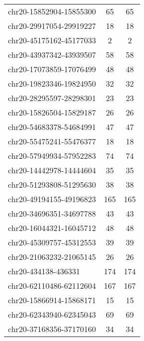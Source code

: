 \begin{longtable}{lSS}
	chr20-15852904-15855300 & 65     & 65                                  \\
	chr20-29917054-29919227 & 18     & 18                                  \\
	chr20-45175162-45177033 & 2      & 2                                   \\
	chr20-43937342-43939507 & 58     & 58                                  \\
	chr20-17073859-17076499 & 48     & 48                                  \\
	chr20-19823346-19824950 & 32     & 32                                  \\
	chr20-28295597-28298301 & 23     & 23                                  \\
	chr20-15826504-15829187 & 26     & 26                                  \\
	chr20-54683378-54684991 & 47     & 47                                  \\
	chr20-55475241-55476377 & 18     & 18                                  \\
	chr20-57949934-57952283 & 74     & 74                                  \\
	chr20-14442978-14444604 & 35     & 35                                  \\
	chr20-51293808-51295630 & 38     & 38                                  \\
	chr20-49194155-49196823 & 165    & 165                                 \\
	chr20-34696351-34697788 & 43     & 43                                  \\
	chr20-16044321-16045712 & 48     & 48                                  \\
	chr20-45309757-45312553 & 39     & 39                                  \\
	chr20-21063232-21065145 & 26     & 26                                  \\
	chr20-434138-436331     & 174    & 174                                 \\
	chr20-62110486-62112604 & 167    & 167                                 \\
	chr20-15866914-15868171 & 15     & 15                                  \\
	chr20-62343940-62345043 & 69     & 69                                  \\
	chr20-37168356-37170160 & 34     & 34                                  \\

\end{longtable}
